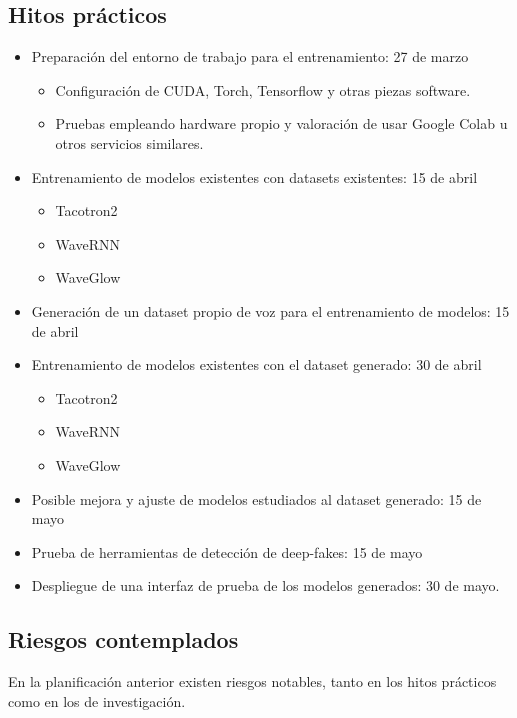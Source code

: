 \subsection{Hitos prácticos}
\begin{itemize}
    \item Preparación del entorno de trabajo para el entrenamiento: 27 de marzo
    \begin{itemize}
        \item Configuración de CUDA, Torch, Tensorflow y otras piezas software.
        \item Pruebas empleando hardware propio y valoración de usar Google Colab u otros servicios similares.
    \end{itemize}
    \item Entrenamiento de modelos existentes con datasets existentes: 15 de abril
    \begin{itemize}
        \item Tacotron2
        \item WaveRNN
        \item WaveGlow
    \end{itemize}
    \item Generación de un dataset propio de voz para el entrenamiento de modelos: 15 de abril
    
    \item Entrenamiento de modelos existentes con el dataset generado: 30 de abril
    \begin{itemize}
        \item Tacotron2
        \item WaveRNN
        \item WaveGlow
    \end{itemize}
    
    \item Posible mejora y ajuste de modelos estudiados al dataset generado: 15 de mayo
    \item Prueba de herramientas de detección de deep-fakes: 15 de mayo
    \item Despliegue de una interfaz de prueba de los modelos generados: 30 de mayo.
    
\end{itemize}

\subsection{Riesgos contemplados}

En la planificación anterior existen riesgos notables, tanto en los hitos prácticos como en los de investigación. 

